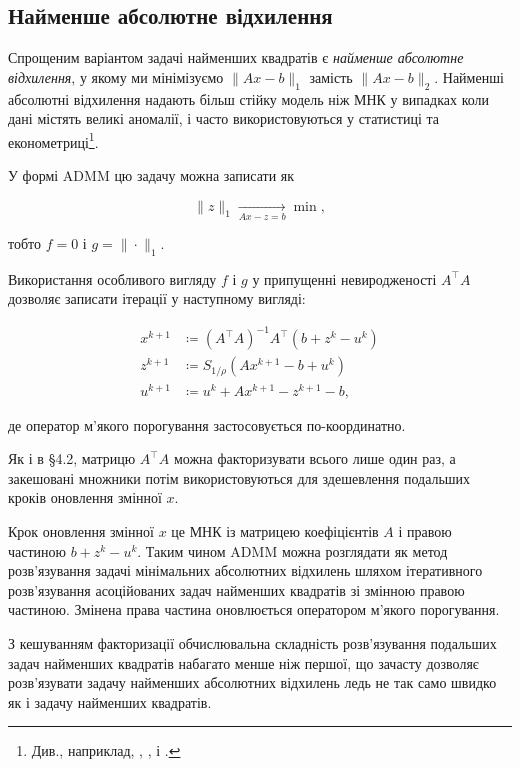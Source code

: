 \subsection{Найменше абсолютне відхилення}

Спрощеним варіантом задачі найменших квадратів є \textit{найменше абсолютне відхилення}, у якому ми мінімізуємо $\|A x - b\|_1$ замість $\|A x - b\|_2$. Найменші абсолютні відхилення надають більш стійку модель ніж МНК у випадках коли дані містять великі аномалії, і часто використовуються у статистиці та економетриці\footnote{Див., наприклад, \cite[\S10.6]{95}, \cite[\S9.6]{171}, і \cite[\S6.1.2]{20}.}. \medskip

У формі ADMM цю задачу можна записати як 

\begin{equation}
    \|z\|_1 \xrightarrow[A x - z = b]{} \min,
\end{equation}

тобто $f = 0$ і $g = \|\cdot\|_1$. \medskip

Використання особливого вигляду $f$ і $g$ у припущенні невиродженості $A^\intercal A$ дозволяє записати ітерації у наступному вигляді:

\begin{align}
    x^{k + 1} &\coloneqq \left(A^\intercal A\right)^{-1} A^\intercal \left(b + z^k - u^k\right) \\
    z^{k + 1} &\coloneqq S_{1 / \rho} \left( A x^{k + 1} - b + u^k \right) \\
    u^{k + 1} &\coloneqq u^k + A x^{k + 1} - z^{k + 1} - b,
\end{align}

де оператор м'якого порогування застосовується по-координатно. 

\begin{remark}
    Як і в \S4.2, матрицю $A^\intercal A$ можна факторизувати всього лише один раз, а закешовані множники потім використовуються для здешевлення подальших кроків оновлення змінної $x$.
\end{remark}

Крок оновлення змінної $x$ це МНК із матрицею коефіцієнтів $A$ і правою частиною $b + z^k - u^k$. Таким чином ADMM можна розглядати як метод розв'язування задачі мінімальних абсолютних відхилень шляхом ітеративного розв'язування асоційованих задач найменших квадратів зі змінною правою частиною. Змінена права частина оновлюється оператором м'якого порогування.

\begin{remark}
    З кешуванням факторизації обчислювальна складність розв'язування подальших задач найменших квадратів набагато менше ніж першої, що зачасту дозволяє розв'язувати задачу найменших абсолютних відхилень ледь не так само швидко як і задачу найменших квадратів.
\end{remark}

